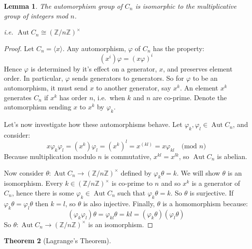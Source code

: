 \documentclass[a4paper, oneside, 12pt, final]{article}
\newtheorem{theorem}{Theorem}[section]
\newtheorem{lemma}[theorem]{Lemma}
\theoremstyle{definition}
\DeclareMathOperator{\Aut}{Aut}
\newcommand{\Z}{\mathbb{Z}}
\newcommand{\Zn}[1]{\Z/#1\Z}
\newcommand{\units}[1]{(\Zn{#1})^\times}
\begin{document}
\begin{lemma}\label{lem:aut}
    The automorphism group of \(C_n\) is isomorphic to the multiplicative group
    of integers mod \(n\).

    i.e. \(\Aut{C_n} \cong \units{n}\)
\end{lemma}

\begin{proof}
    Let \(C_n = \langle x \rangle\).
    Any automorphism, \(\varphi\) of \(C_n\) has the property:
    \[(x^i)\varphi = {(x\varphi)}^i\]
    Hence \(\varphi\) is determined by it's effect on a generator, \(x\), and preserves element
    order.
    In particular, \(\varphi\) sends generators to generators.
    So for \(\varphi\) to be an automorphism, it must send \(x\) to another generator, say \(x^k\).
    An element \(x^k\) generates \(C_n\) if \(x^k\) has order \(n\), i.e.\ when \(k\) and \(n\) are co-prime.
    Denote the automorphism sending \(x\) to \(x^k\) by \(\varphi_k\).

    Let's now investigate how these automorphisms behave.
    Let \(\varphi_k, \varphi_l \in \Aut{C_n}\), and consider:
    \[x\varphi_k\varphi_l = (x^k)\varphi_l = {(x^k)}^l = x^{(kl)} = x\varphi_{kl} \quad \text{(mod \(n\))}\]
    Because multiplication modulo \(n\) is commutative, \(x^{kl} = x^{lk}\), so \(\Aut{C_n}\) is abelian.

    Now consider \(\theta:\Aut{C_n} \to \units{n}\) defined by \(\varphi_k\theta = k\).
    We will show \(\theta\) is an isomorphism.
    Every \(k \in \units{n}\) is co-prime to \(n\) and so \(x^k\) is a generator of \(C_n\), hence there is some \(\varphi_k
    \in \Aut{C_n}\) such that \(\varphi_k\theta = k\).
    So \(\theta\) is surjective.
    If \(\varphi_k\theta = \varphi_l\theta\) then \(k = l\), so \(\theta\) is also injective.
    Finally, \(\theta\) is a homomorphism because:
    \[(\varphi_k\varphi_l)\theta = \varphi_{kl}\theta = kl = (\varphi_k\theta)(\varphi_l\theta)\]
    So \(\theta:\Aut{C_n} \to \units{n}\) is an isomorphism.
\end{proof}

\begin{theorem}[Lagrange's Theorem]

\end{theorem}
\end{document}
